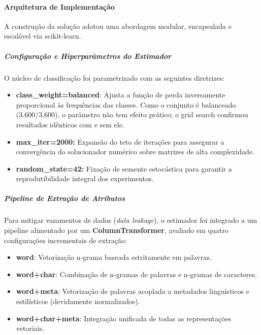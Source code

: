 \documentclass[
  brazilian,
  11pt,
]{article}
\providecommand{\tightlist}{%
  \setlength{\itemsep}{0pt}\setlength{\parskip}{0pt}}
\begin{document}
\paragraph{Arquitetura de Implementação}\label{arquitetura-de-implementauxe7uxe3o}

A construção da solução adotou uma abordagem modular, encapsulada e escalável via scikit-learn.

\subparagraph{Configuração e Hiperparâmetros do Estimador}\label{configurauxe7uxe3o-e-hiperparuxe2metros-do-estimador}

O núcleo de classificação foi parametrizado com as seguintes diretrizes:

\begin{itemize}
\tightlist
\item
  \textbf{class\_weight=\textquotesingle balanced\textquotesingle{}}: Ajusta a função de perda inversamente proporcional às frequências das classes. Como o conjunto é balanceado (3.600/3.600), o parâmetro não tem efeito prático; o grid search confirmou resultados idênticos com e sem ele.
\item
  \textbf{max\_iter=2000:} Expansão do teto de iterações para assegurar a convergência do solucionador numérico sobre matrizes de alta complexidade.
\item
  \textbf{random\_state=42:} Fixação de semente estocástica para garantir a reprodutibilidade integral dos experimentos.
\end{itemize}

\subparagraph{Pipeline de Extração de Atributos}\label{pipeline-de-extrauxe7uxe3o-de-atributos}

Para mitigar vazamentos de dados (\emph{data leakage}), o estimador foi integrado a um pipeline alimentado por um \textbf{ColumnTransformer}, avaliado em quatro configurações incrementais de extração:

\begin{itemize}
\tightlist
\item
  \textbf{word}: Vetorização n-grama baseada estritamente em palavras.
\item
  \textbf{word+char}: Combinação de n-gramas de palavras e n-gramas de caracteres.
\item
  \textbf{word+meta}: Vetorização de palavras acoplada a metadados linguísticos e estilísticos (devidamente normalizados).
\item
  \textbf{word+char+meta}: Integração unificada de todas as representações vetoriais.
\end{itemize}
\end{document}
